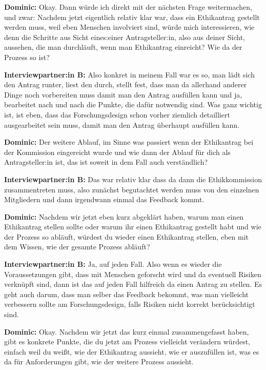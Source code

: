 \documentclass[a4paper,12pt,twoside]{scrreprt}
\begin{document}
\textbf{Dominic:} Okay. Dann würde ich direkt mit der nächsten Frage weitermachen, und zwar: Nachdem jetzt eigentlich relativ klar war, dass ein Ethikantrag gestellt werden muss, weil eben Menschen involviert sind, würde mich interessieren, wie denn die Schritte aus Sicht eines:einer Antragsteller:in, also aus deiner Sicht, aussehen, die man durchläuft, wenn man Ethikantrag einreicht? Wie da der Prozess so ist?

\textbf{Interviewpartner:in B:} Also konkret in meinem Fall war es so, man lädt sich den Antrag runter, liest den durch, stellt fest, dass man da allerhand anderer Dinge noch vorbereiten muss damit man den Antrag ausfüllen kann und ja, bearbeitet nach und nach die Punkte, die dafür notwendig sind. Was ganz wichtig ist, ist eben, dass das Forschungsdesign schon vorher ziemlich detailliert ausgearbeitet sein muss, damit man den Antrag überhaupt ausfüllen kann.

\textbf{Dominic:} Der weitere Ablauf, im Sinne was passiert wenn der Ethikantrag bei der Kommission eingereicht wurde und wie dann der Ablauf für dich als Antragsteller:in ist, das ist soweit in dem Fall auch verständlich?

\textbf{Interviewpartner:in B:} Das war relativ klar dass da dann die Ethikkommission zusammentreten muss, also zunächst begutachtet werden muss von den einzelnen Mitgliedern und dann irgendwann einmal das Feedback kommt.

\textbf{Dominic:} Nachdem wir jetzt eben kurz abgeklärt haben, warum man einen Ethikantrag stellen sollte oder warum ihr einen Ethikantrag gestellt habt und wie der Prozess so abläuft, würdest du wieder einen Ethikantrag stellen, eben mit dem Wissen, wie der gesamte Prozess abläuft?

\textbf{Interviewpartner:in B:} Ja, auf jeden Fall. Also wenn es wieder die Voraussetzungen gibt, dass mit Menschen geforscht wird und da eventuell Risiken verknüpft sind, dann ist das auf jeden Fall hilfreich da einen Antrag zu stellen. Es geht auch darum, dass man selber das Feedback bekommt, was man vielleicht verbessern sollte am Forschungsdesign, falls Risiken nicht korrekt berücksichtigt sind.

\textbf{Dominic:} Okay. Nachdem wir jetzt das kurz einmal zusammengefasst haben, gibt es konkrete Punkte, die du jetzt am Prozess vielleicht verändern würdest, einfach weil du weißt, wie der Ethikantrag aussieht, wie er auszufüllen ist, was es da für Anforderungen gibt, wie der weitere Prozess aussieht.
\end{document}
